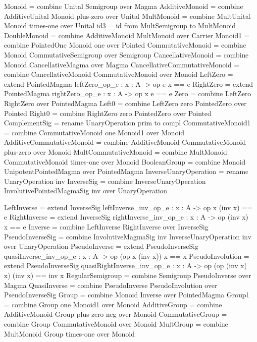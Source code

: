 \begin{togcode} 
Monoid = combine Unital {} Semigroup {} over Magma
AdditiveMonoid = combine AdditiveUnital {} Monoid plus-zero over Unital
MultMonoid = combine MultUnital {} Monoid times-one over Unital
id3 = id from MultSemigroup to MultMonoid
DoubleMonoid = combine AdditiveMonoid {} MultMonoid {} over Carrier 
Monoid1 = combine PointedOne {} Monoid one over Pointed
CommutativeMonoid = 
  combine Monoid {} CommutativeSemigroup {} over Semigroup
CancellativeMonoid = combine Monoid {} CancellativeMagma {} over Magma 
CancellativeCommutativeMonoid = 
  combine CancellativeMonoid {} CommutativeMonoid {} over Monoid
LeftZero  = extend PointedMagma {leftZero_op_e  : {x : A} -> op e x == e}
RightZero = extend PointedMagma {rightZero_op_e : {x : A} -> op x e == e}
Zero = combine LeftZero {} RightZero {} over PointedMagma
Left0 = combine LeftZero zero PointedZero {} over Pointed
Right0 = combine RightZero zero PointedZero {} over Pointed
ComplementSig = rename UnaryOperation {prim to compl}
CommutativeMonoid1 = combine CommutativeMonoid one Monoid1 {} over Monoid
AdditiveCommutativeMonoid = 
  combine AdditiveMonoid {} CommutativeMonoid plus-zero over Monoid
MultCommutativeMonoid = 
  combine MultMonoid {} CommutativeMonoid times-one over Monoid
BooleanGroup = combine Monoid {} UnipotentPointedMagma {} over PointedMagma
InverseUnaryOperation = rename UnaryOperation inv  
InverseSig = 
  combine InverseUnaryOperation {} InvolutivePointedMagmaSig inv 
  over UnaryOperation
\end{togcode} 

\begin{togcode} 
LeftInverse  = 
  extend InverseSig 
        {leftInverse_inv_op_e  : {x : A} -> op x (inv x) == e}
RightInverse = 
  extend InverseSig 
        {rightInverse_inv_op_e : {x : A} -> op (inv x) x == e}
Inverse = combine LeftInverse {} RightInverse {} over InverseSig
PseudoInverseSig = 
  combine InvolutiveMagmaSig inv InverseUnaryOperation inv 
  over UnaryOperation
PseudoInverse = 
  extend PseudoInverseSig {quasiInverse_inv_op_e : {x : A} -> 
       op (op x (inv x)) x == x}
PseudoInvolution = extend PseudoInverseSig
   {quasiRightInverse_inv_op_e : {x : A} -> 
        op (op (inv x) x) (inv x) == inv x}
RegularSemigroup = combine Semigroup {} PseudoInverse {} over Magma
QuasiInverse = 
  combine PseudoInverse {} PseudoInvolution {} 
  over PseudoInverseSig
Group  = combine Monoid {} Inverse {} over PointedMagma    
Group1 = combine Group one Monoid1 {} over Monoid
AdditiveGroup = 
  combine AdditiveMonoid {} Group plus-zero-neg over Monoid 
CommutativeGroup = combine Group {} CommutativeMonoid {} over Monoid
MultGroup = combine MultMonoid {} Group times-one over Monoid
\end{togcode} 

